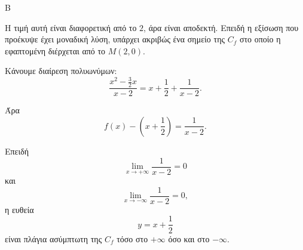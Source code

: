 \begin{thema}{Β}
\begin{erwthma}
Η τιμή αυτή είναι διαφορετική από το $2$, άρα είναι αποδεκτή. Επειδή η εξίσωση που προέκυψε έχει μοναδική λύση, υπάρχει ακριβώς ένα σημείο της $C_f$ στο οποίο η εφαπτομένη διέρχεται από το $M(2,0)$.

\item Κάνουμε διαίρεση πολυωνύμων:
\[
\frac{x^2-\frac{3}{2}x}{x-2}
=x+\frac{1}{2}+\frac{1}{x-2}.
\]

Άρα
\[
f(x)-\left(x+\frac{1}{2}\right)=\frac{1}{x-2}.
\]

Επειδή
\[
\lim_{x\to+\infty}\frac{1}{x-2}=0
\]
και
\[
\lim_{x\to-\infty}\frac{1}{x-2}=0,
\]
η ευθεία
\[
y=x+\frac{1}{2}
\]
είναι πλάγια ασύμπτωτη της $C_f$ τόσο στο $+\infty$ όσο και στο $-\infty$.
\end{erwthma}
\end{thema}



